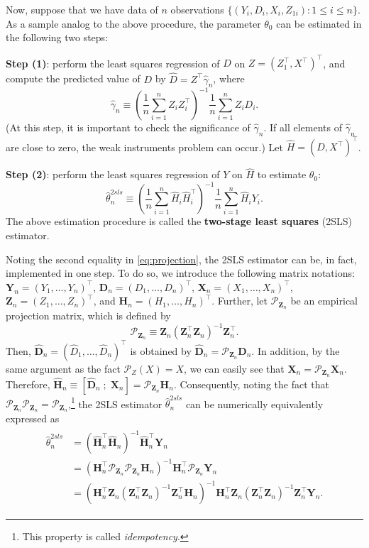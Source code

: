 \documentclass[10.5pt, A4paper, openany, uplatex]{book}
\newcommand{\mbf}{\mathbf}
\newcommand{\mcl}{\mathcal}
\renewcommand{\hat}{\widehat}
\numberwithin{equation}{section}
\begin{document}
Now, suppose that we have data of $n$ observations $\{(Y_i, D_i, X_i, Z_{1i}): 1 \le i \le n\}$.
As a sample analog to the above procedure, the parameter $\theta_0$ can be estimated in the following two steps:

\textbf{Step (1)}: perform the least squares regression of $D$ on $Z = (Z_1^\top, X^\top)^\top$, and compute the predicted value of $D$ by $\hat D = Z^\top \hat\gamma_n$, where
\[
\hat\gamma_n \equiv \left( \frac{1}{n}\sum_{i=1}^n Z_i Z_i^\top \right)^{-1}\frac{1}{n}\sum_{i=1}^n Z_i D_i. 
\]
(At this step, it is important to check the significance of $\hat \gamma_n$.
If all elements of $\hat\gamma_n$ are close to zero, the weak instruments problem can occur.)
Let $\hat H = (\hat D, X^\top)^\top$.

\textbf{Step (2)}: perform the least squares regression of $Y$ on $\hat H$ to estimate $\theta_0$:
\[
	\hat\theta_n^{2sls} \equiv \left( \frac{1}{n}\sum_{i=1}^n \hat H_i \hat H_i^\top \right)^{-1}\frac{1}{n}\sum_{i=1}^n \hat H_i Y_i.
\]
The above estimation procedure is called the \textbf{two-stage least squares} (2SLS) estimator.
\bigskip

Noting the second equality in \eqref{eq:projection}, the 2SLS estimator can be, in fact, implemented in one step.
To do so, we introduce the following matrix notations: $\mbf{Y}_n = (Y_1, \ldots , Y_n)^\top$, $\mbf{D}_n = (D_1, \ldots, D_n)^\top$, $\mbf{X}_n = (X_1, \ldots, X_n)^\top$, $\mbf{Z}_n = (Z_1, \ldots, Z_n)^\top$, and $\mbf{H}_n = (H_1, \dots , H_n)^\top$.
Further, let $\mcl{P}_{\mbf{Z}_n}$ be an empirical projection matrix, which is defined by
\[
	\mcl{P}_{\mbf{Z}_n} \equiv \mbf{Z}_n(\mbf{Z}_n^\top \mbf{Z}_n)^{-1} \mbf{Z}_n^\top.
\]
Then, $\hat{\mbf{D}}_n = (\hat D_1, \ldots , \hat D_n)^\top$ is obtained by $\hat{\mbf{D}}_n = \mcl{P}_{\mbf{Z}_n} \mbf{D}_n$.
In addition, by the same argument as the fact $\mcl{P}_Z(X) = X$, we can easily see that $\mbf{X}_n = \mcl{P}_{\mbf{Z}_n} \mbf{X}_n$.
Therefore, $\hat{\mbf{H}}_n \equiv [\hat{\mbf{D}}_n \; ; \; \mbf{X}_n] = \mcl{P}_{\mbf{Z}_n}\mbf{H}_n$.
Consequently, noting the fact that $\mcl{P}_{\mbf{Z}_n}\mcl{P}_{\mbf{Z}_n} = \mcl{P}_{\mbf{Z}_n}$,\footnote{This property is called \textit{idempotency}.} the 2SLS estimator $\hat\theta_n^{2sls}$ can be numerically equivalently expressed as 
\begin{align}\label{eq:2slsMat}
	\begin{split}
	\hat\theta_n^{2sls}
	& = \left(\hat{\mbf{H}}_n^\top \hat{\mbf{H}}_n \right)^{-1} \hat{\mbf{H}}_n^\top \mbf{Y}_n\\
	& = \left(\mbf{H}_n^\top \mcl{P}_{\mbf{Z}_n} \mcl{P}_{\mbf{Z}_n} \mbf{H}_n \right)^{-1} \mbf{H}_n^\top \mcl{P}_{\mbf{Z}_n} \mbf{Y}_n \\
	& = \left(\mbf{H}_n^\top  \mbf{Z}_n(\mbf{Z}_n^\top \mbf{Z}_n)^{-1} \mbf{Z}_n^\top \mbf{H}_n \right)^{-1} \mbf{H}_n^\top  \mbf{Z}_n(\mbf{Z}_n^\top \mbf{Z}_n)^{-1} \mbf{Z}_n^\top \mbf{Y}_n.
	\end{split}
\end{align}
\end{document}
